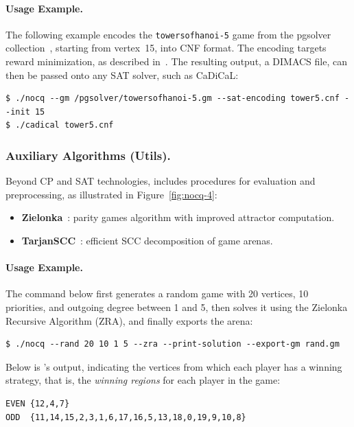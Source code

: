 \documentclass[a4paper,UKenglish,cleveref, autoref, thm-restate, anonymous]{lipics-v2021}
\begin{document}
\paragraph{Usage Example.}
The following example encodes the \texttt{towersofhanoi-5} game from the pgsolver collection~\cite{Friedmann:2017}, starting from vertex~15, into CNF format. The encoding targets reward minimization, as described in~\cite{Heljanko:2012}. The resulting output, a DIMACS file, can then be passed onto any SAT solver, such as CaDiCaL:

\begin{lstlisting}
$ ./nocq --gm /pgsolver/towersofhanoi-5.gm --sat-encoding tower5.cnf --init 15
$ ./cadical tower5.cnf
\end{lstlisting}

\subsubsection*{Auxiliary Algorithms (Utils).}

Beyond CP and SAT technologies, \nocq includes procedures for evaluation and preprocessing, as illustrated in Figure~\ref{fig:nocq-4}:

\begin{itemize}
    \item \textbf{Zielonka}~\cite{Araya:2008}: parity games algorithm with improved attractor computation.
    \item \textbf{TarjanSCC}~\cite{Tarjan:1972}: efficient SCC decomposition of game arenas.
\end{itemize}

\paragraph{Usage Example.}
The command below first generates a random game with 20 vertices, 10 priorities, and outgoing degree between 1 and 5, then solves it using the Zielonka Recursive Algorithm (ZRA), and finally exports the arena:
\begin{lstlisting}
$ ./nocq --rand 20 10 1 5 --zra --print-solution --export-gm rand.gm
\end{lstlisting}

\noindent Below is \nocq's output, indicating the vertices from which each player has a winning strategy, that is, the {\em winning regions} for each player in the game:
\begin{lstlisting}
EVEN {12,4,7}
ODD  {11,14,15,2,3,1,6,17,16,5,13,18,0,19,9,10,8}
\end{lstlisting}
\end{document}
